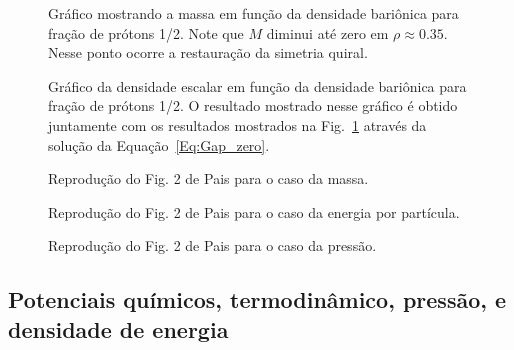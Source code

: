 \begin{figure}
	
	\caption{Gráfico mostrando a massa em função da densidade bariônica para fração de prótons 1/2. Note que $M$ diminui até zero em $\rho \approx 0.35$. Nesse ponto ocorre a restauração da simetria quiral. \protect}
	\label{Fig:mass_graph}
\end{figure}

\begin{figure}
	
	\caption{Gráfico da densidade escalar em função da densidade bariônica para fração de prótons 1/2. O resultado mostrado nesse gráfico é obtido juntamente com os resultados mostrados na Fig.~\ref{Fig:mass_graph} através da solução da Equação~\ref{Eq:Gap_zero}. \protect}
	\label{Fig:scalar_density_graph}
\end{figure}

\begin{figure}
	
	\caption{Reprodução do Fig. 2 de Pais para o caso da massa.}
	\label{Fig:Mass_Rep_Pais}
\end{figure}

\begin{figure}
	
	\caption{Reprodução do Fig. 2 de Pais para o caso da energia por partícula.}
	\label{Fig:en_per_part_Rep_Pais}
\end{figure}

\begin{figure}
	
	\caption{Reprodução do Fig. 2 de Pais para o caso da pressão.}
	\label{Fig:pressure_Rep_Pais}
\end{figure}

\FloatBarrier
\subsection{Potenciais químicos, termodinâmico, pressão, e densidade de energia}

